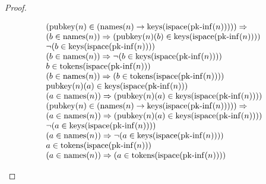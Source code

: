 \documentclass[11pt]{article}
\theoremstyle{plain}
\begin{document}
\begin{proof}
\begin{itemize}[leftmargin=2.8em, itemsep=4pt, parsep=1pt]
\begin{itemize}[leftmargin=2.8em, itemsep=4pt, parsep=1pt]
\begin{equation*}
\begin{array}{@{}l@{}}
\begin{array}{@{}l@{}} (\operatorname{pubkey}(n) \in (\operatorname{names}(n) \to \operatorname{keys}(\operatorname{ispace}(\operatorname{pk\text{-}inf}(n))))) \Rightarrow  \\ (b \in \operatorname{names}(n)) \Rightarrow (\operatorname{pubkey}(n)(b) \in \operatorname{keys}(\operatorname{ispace}(\operatorname{pk\text{-}inf}(n)))) \end{array} \\
\neg (b \in \operatorname{keys}(\operatorname{ispace}(\operatorname{pk\text{-}inf}(n)))) \\
(b \in \operatorname{names}(n)) \Rightarrow \neg (b \in \operatorname{keys}(\operatorname{ispace}(\operatorname{pk\text{-}inf}(n)))) \\
b \in \operatorname{tokens}(\operatorname{ispace}(\operatorname{pk\text{-}inf}(n))) \\
(b \in \operatorname{names}(n)) \Rightarrow (b \in \operatorname{tokens}(\operatorname{ispace}(\operatorname{pk\text{-}inf}(n)))) \\
\operatorname{pubkey}(n)(a) \in \operatorname{keys}(\operatorname{ispace}(\operatorname{pk\text{-}inf}(n))) \\
(a \in \operatorname{names}(n)) \Rightarrow (\operatorname{pubkey}(n)(a) \in \operatorname{keys}(\operatorname{ispace}(\operatorname{pk\text{-}inf}(n)))) \\
\begin{array}{@{}l@{}} (\operatorname{pubkey}(n) \in (\operatorname{names}(n) \to \operatorname{keys}(\operatorname{ispace}(\operatorname{pk\text{-}inf}(n))))) \Rightarrow  \\ (a \in \operatorname{names}(n)) \Rightarrow (\operatorname{pubkey}(n)(a) \in \operatorname{keys}(\operatorname{ispace}(\operatorname{pk\text{-}inf}(n)))) \end{array} \\
\neg (a \in \operatorname{keys}(\operatorname{ispace}(\operatorname{pk\text{-}inf}(n)))) \\
(a \in \operatorname{names}(n)) \Rightarrow \neg (a \in \operatorname{keys}(\operatorname{ispace}(\operatorname{pk\text{-}inf}(n)))) \\
a \in \operatorname{tokens}(\operatorname{ispace}(\operatorname{pk\text{-}inf}(n))) \\
(a \in \operatorname{names}(n)) \Rightarrow (a \in \operatorname{tokens}(\operatorname{ispace}(\operatorname{pk\text{-}inf}(n)))) \\

\end{array}
\end{equation*}
\end{itemize}
\end{itemize}
\end{proof}
\end{document}
